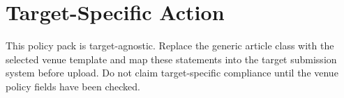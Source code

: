\documentclass[10pt]{article}
\begin{document}
\section{Target-Specific Action}
This policy pack is target-agnostic. Replace the generic article class with the selected venue template and map these statements into the target submission system before upload. Do not claim target-specific compliance until the venue policy fields have been checked.
\end{document}
